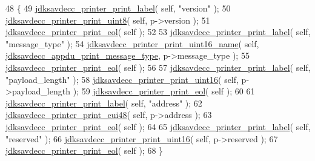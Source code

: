 \begin{DoxyCode}
48 \{
49     \hyperlink{group__util_gaf7818b24143b3c7502926a425a242ff5}{jdksavdecc\_printer\_print\_label}( \textcolor{keyword}{self}, \textcolor{stringliteral}{"version"} );
50     \hyperlink{group__util_ga00205f7730fc39a5b93655a3b18a8dc7}{jdksavdecc\_printer\_print\_uint8}( \textcolor{keyword}{self}, p->version );
51     \hyperlink{group__util_gacda56c9d3d24593a52c999682fa6e6e3}{jdksavdecc\_printer\_print\_eol}( \textcolor{keyword}{self} );
52 
53     \hyperlink{group__util_gaf7818b24143b3c7502926a425a242ff5}{jdksavdecc\_printer\_print\_label}( \textcolor{keyword}{self}, \textcolor{stringliteral}{"message\_type"} );
54     \hyperlink{group__util_ga62486d864a66773d19bbbe23cebf346a}{jdksavdecc\_printer\_print\_uint16\_name}( \textcolor{keyword}{self}, 
      \hyperlink{group__app__print_gacf0a940a6c4ba23d14ff138ab52dbc45}{jdksavdecc\_appdu\_print\_message\_type}, p->message\_type );
55     \hyperlink{group__util_gacda56c9d3d24593a52c999682fa6e6e3}{jdksavdecc\_printer\_print\_eol}( \textcolor{keyword}{self} );
56 
57     \hyperlink{group__util_gaf7818b24143b3c7502926a425a242ff5}{jdksavdecc\_printer\_print\_label}( \textcolor{keyword}{self}, \textcolor{stringliteral}{"payload\_length"} );
58     \hyperlink{group__util_ga9793e0ff8e7ed25d957282ee6b257ce2}{jdksavdecc\_printer\_print\_uint16}( \textcolor{keyword}{self}, p->payload\_length );
59     \hyperlink{group__util_gacda56c9d3d24593a52c999682fa6e6e3}{jdksavdecc\_printer\_print\_eol}( \textcolor{keyword}{self} );
60 
61     \hyperlink{group__util_gaf7818b24143b3c7502926a425a242ff5}{jdksavdecc\_printer\_print\_label}( \textcolor{keyword}{self}, \textcolor{stringliteral}{"address"} );
62     \hyperlink{group__util_gacb8108c4a12e752331804ec34d89f9ab}{jdksavdecc\_printer\_print\_eui48}( \textcolor{keyword}{self}, p->address );
63     \hyperlink{group__util_gacda56c9d3d24593a52c999682fa6e6e3}{jdksavdecc\_printer\_print\_eol}( \textcolor{keyword}{self} );
64 
65     \hyperlink{group__util_gaf7818b24143b3c7502926a425a242ff5}{jdksavdecc\_printer\_print\_label}( \textcolor{keyword}{self}, \textcolor{stringliteral}{"reserved"} );
66     \hyperlink{group__util_ga9793e0ff8e7ed25d957282ee6b257ce2}{jdksavdecc\_printer\_print\_uint16}( \textcolor{keyword}{self}, p->reserved );
67     \hyperlink{group__util_gacda56c9d3d24593a52c999682fa6e6e3}{jdksavdecc\_printer\_print\_eol}( \textcolor{keyword}{self} );
68 \}
\end{DoxyCode}


